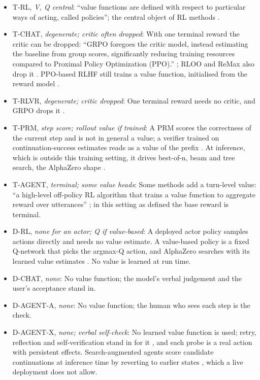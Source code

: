 \documentclass{article}
\providecommand{\tightlist}{\setlength{\itemsep}{0pt}\setlength{\parskip}{0pt}}
\begin{document}
\begin{itemize}
\tightlist
\item
  T-RL, \emph{V, Q central}: ``value functions are defined with respect to particular ways of acting, called policies''; the central object of RL methods \citep{sutton2018}.
\item
  T-CHAT, \emph{degenerate; critic often dropped}: With one terminal reward the critic can be dropped: ``GRPO foregoes the critic model, instead estimating the baseline from group scores, significantly reducing training resources compared to Proximal Policy Optimization (PPO).'' \citep{shao2024}; RLOO and ReMax also drop it \citep{ahmadian2024, li2024}. PPO-based RLHF still trains a value function, initialised from the reward model \citep{ouyang2022}.
\item
  T-RLVR, \emph{degenerate; critic dropped}: One terminal reward needs no critic, and GRPO drops it \citep{shao2024}.
\item
  T-PRM, \emph{step score; rollout value if trained}: A PRM scores the correctness of the current step and is not in general a value; a verifier trained on continuation-success estimates reads as a value of the prefix \citep{snell2024}. At inference, which is outside this training setting, it drives best-of-n, beam and tree search, the AlphaZero shape \citep{zhang2025, feng2023, silver2017}.
\item
  T-AGENT, \emph{terminal; some value heads}: Some methods add a turn-level value: ``a high-level off-policy RL algorithm that trains a value function to aggregate reward over utterances'' \citep{zhou2024b}; in this setting as defined the base reward is terminal.
\item
  D-RL, \emph{none for an actor; Q if value-based}: A deployed actor policy samples actions directly and needs no value estimate. A value-based policy is a fixed Q-network that picks the argmax-Q action, and AlphaZero searches with its learned value estimates \citep{silver2017}. No value is learned at run time.
\item
  D-CHAT, \emph{none}: No value function; the model's verbal judgement and the user's acceptance stand in.
\item
  D-AGENT-A, \emph{none}: No value function; the human who sees each step is the check.
\item
  D-AGENT-X, \emph{none; verbal self-check}: No learned value function is used; retry, reflection and self-verification stand in for it \citep{shinn2023}, and each probe is a real action with persistent effects. Search-augmented agents score candidate continuations at inference time by reverting to earlier states \citep{zhou2024a}, which a live deployment does not allow.
\end{itemize}
\end{document}
